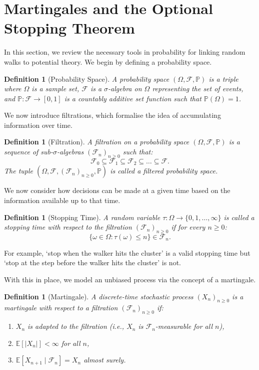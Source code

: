 \documentclass[12pt, a4paper, oneside]{report}
\newtheorem{definition}[theorem]{Definition}
\theoremstyle{remark}
\begin{document}
\section{Martingales and the Optional Stopping Theorem}
In this section, we review the necessary tools in probability for linking random walks to potential theory. We begin by defining a probability space.

\begin{definition}[Probability Space]
A probability space $(\Omega, \mathcal{F}, \mathbb{P})$ is a triple where $\Omega$ is a sample set, $\mathcal{F}$ is a $\sigma$-algebra on $\Omega$ representing the set of events, and $\mathbb{P} \colon \mathcal{F}\to[0,1]$ is a countably additive set function such that $\mathbb{P}(\Omega)=1$.
\end{definition}

\noindent We now introduce filtrations, which formalise the idea of accumulating information over time. 
\begin{definition}[Filtration]
A filtration on a probability space $(\Omega, \mathcal{F}, \mathbb{P})$ is a sequence of sub-$\sigma$-algebras $(\mathcal{F}_n)_{n \geq 0}$ such that:
\begin{equation*}
    \mathcal{F}_0 \subseteq \mathcal{F}_1 \subseteq \mathcal{F}_2 \subseteq \dots \subseteq \mathcal{F}.
\end{equation*}
The tuple $(\Omega, \mathcal{F}, (\mathcal{F}_n)_{n \geq 0}, \mathbb{P})$ is called a filtered probability space.
\end{definition}

\noindent We now consider how decisions can be made at a given time based on the information available up to that time.
\begin{definition}[Stopping Time]
A random variable $\tau \colon \Omega \to \{0, 1, \dots, \infty\}$ is called a stopping time with respect to the filtration $(\mathcal{F}_n)_{n \geq 0}$ if for every $n \geq 0$:
\begin{equation*}
    \{ \omega \in \Omega : \tau(\omega) \leq n \} \in \mathcal{F}_n.
\end{equation*}
\end{definition}

\noindent For example, `stop when the walker hits the cluster' is a valid stopping time but `stop at the step before the walker hits the cluster' is not.

\noindent With this in place, we model an unbiased process via the concept of a martingale.
\begin{definition}[Martingale]
A discrete-time stochastic process $(X_n)_{n \geq 0}$ is a martingale with respect to a filtration $(\mathcal{F}_n)_{n \geq 0}$ if:
\begin{enumerate}
    \item $X_n$ is adapted to the filtration (i.e., $X_n$ is $\mathcal{F}_n$-measurable for all $n$),
    \item $\mathbb{E}[|X_n|] < \infty$ for all $n$,
    \item $\mathbb{E}[X_{n+1} \mid \mathcal{F}_n] = X_n$ almost surely.
\end{enumerate}
\end{definition}
\end{document}
